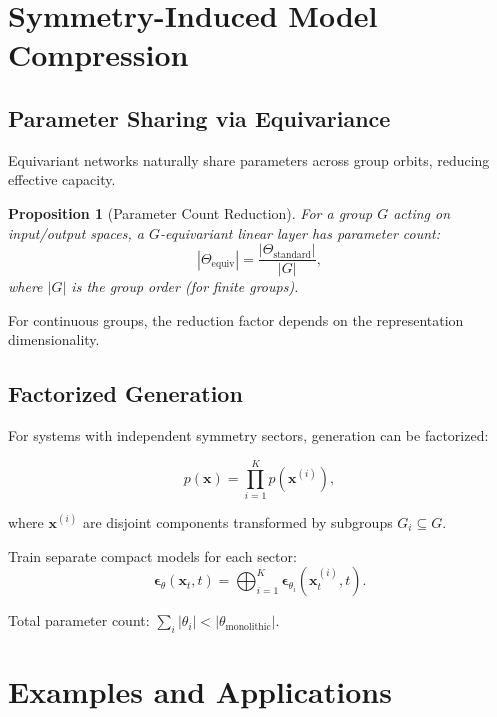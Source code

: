 \documentclass[12pt]{report}
\newtheorem{proposition}[theorem]{Proposition}
\theoremstyle{definition}
\begin{document}
\section{Symmetry-Induced Model Compression}

\subsection{Parameter Sharing via Equivariance}

Equivariant networks naturally share parameters across group orbits, reducing effective capacity.

\begin{proposition}[Parameter Count Reduction]
For a group $G$ acting on input/output spaces, a $G$-equivariant linear layer has parameter count:
\begin{equation}
|\Theta_{\text{equiv}}| = \frac{|\Theta_{\text{standard}}|}{|G|},
\label{eq:parameter_reduction}
\end{equation}
where $|G|$ is the group order (for finite groups).
\end{proposition}

For continuous groups, the reduction factor depends on the representation dimensionality.

\subsection{Factorized Generation}

For systems with independent symmetry sectors, generation can be factorized:

\begin{equation}
p(\mathbf{x}) = \prod_{i=1}^K p(\mathbf{x}^{(i)}),
\label{eq:factorized_generation}
\end{equation}

where $\mathbf{x}^{(i)}$ are disjoint components transformed by subgroups $G_i \subseteq G$.

Train separate compact models for each sector:
\begin{equation}
\boldsymbol{\epsilon}_\theta(\mathbf{x}_t, t) = \bigoplus_{i=1}^K \boldsymbol{\epsilon}_{\theta_i}(\mathbf{x}_t^{(i)}, t).
\label{eq:factorized_denoiser}
\end{equation}

Total parameter count: $\sum_i |\theta_i| < |\theta_{\text{monolithic}}|$.

\section{Examples and Applications}
\end{document}
